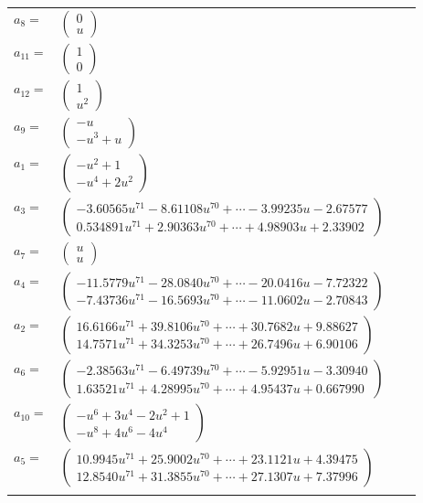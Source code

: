 \documentclass[1p]{elsarticle_modified}
\theoremstyle{definition}
\begin{document}
\begin{tabular}{m{7pt} m{180pt} m{7pt} m{180pt} }
\flushright $a_{8}=$&$\begin{pmatrix}0\\u\end{pmatrix}$ \\
\flushright $a_{11}=$&$\begin{pmatrix}1\\0\end{pmatrix}$ \\
\flushright $a_{12}=$&$\begin{pmatrix}1\\u^2\end{pmatrix}$ \\
\flushright $a_{9}=$&$\begin{pmatrix}- u\\- u^3+u\end{pmatrix}$ \\
\flushright $a_{1}=$&$\begin{pmatrix}- u^2+1\\- u^4+2 u^2\end{pmatrix}$ \\
\flushright $a_{3}=$&$\begin{pmatrix}-3.60565 u^{71}-8.61108 u^{70}+\cdots-3.99235 u-2.67577\\0.534891 u^{71}+2.90363 u^{70}+\cdots+4.98903 u+2.33902\end{pmatrix}$ \\
\flushright $a_{7}=$&$\begin{pmatrix}u\\u\end{pmatrix}$ \\
\flushright $a_{4}=$&$\begin{pmatrix}-11.5779 u^{71}-28.0840 u^{70}+\cdots-20.0416 u-7.72322\\-7.43736 u^{71}-16.5693 u^{70}+\cdots-11.0602 u-2.70843\end{pmatrix}$ \\
\flushright $a_{2}=$&$\begin{pmatrix}16.6166 u^{71}+39.8106 u^{70}+\cdots+30.7682 u+9.88627\\14.7571 u^{71}+34.3253 u^{70}+\cdots+26.7496 u+6.90106\end{pmatrix}$ \\
\flushright $a_{6}=$&$\begin{pmatrix}-2.38563 u^{71}-6.49739 u^{70}+\cdots-5.92951 u-3.30940\\1.63521 u^{71}+4.28995 u^{70}+\cdots+4.95437 u+0.667990\end{pmatrix}$ \\
\flushright $a_{10}=$&$\begin{pmatrix}- u^6+3 u^4-2 u^2+1\\- u^8+4 u^6-4 u^4\end{pmatrix}$ \\
\flushright $a_{5}=$&$\begin{pmatrix}10.9945 u^{71}+25.9002 u^{70}+\cdots+23.1121 u+4.39475\\12.8540 u^{71}+31.3855 u^{70}+\cdots+27.1307 u+7.37996\end{pmatrix}$\\&\end{tabular}
\end{document}
